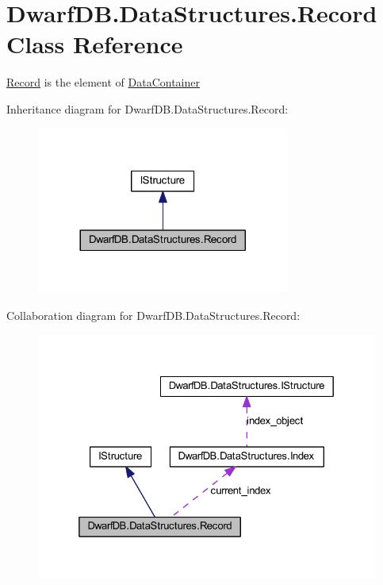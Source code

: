 \hypertarget{class_dwarf_d_b_1_1_data_structures_1_1_record}{\section{Dwarf\+D\+B.\+Data\+Structures.\+Record Class Reference}
\label{class_dwarf_d_b_1_1_data_structures_1_1_record}
}


\hyperlink{class_dwarf_d_b_1_1_data_structures_1_1_record}{Record} is the element of \hyperlink{class_dwarf_d_b_1_1_data_structures_1_1_data_container}{Data\+Container}  




Inheritance diagram for Dwarf\+D\+B.\+Data\+Structures.\+Record\+:
\nopagebreak
\begin{figure}[H]
\begin{center}
\leavevmode
\includegraphics[width=236pt]{class_dwarf_d_b_1_1_data_structures_1_1_record__inherit__graph}
\end{center}
\end{figure}


Collaboration diagram for Dwarf\+D\+B.\+Data\+Structures.\+Record\+:
\nopagebreak
\begin{figure}[H]
\begin{center}
\leavevmode
\includegraphics[width=325pt]{class_dwarf_d_b_1_1_data_structures_1_1_record__coll__graph}
\end{center}
\end{figure}
